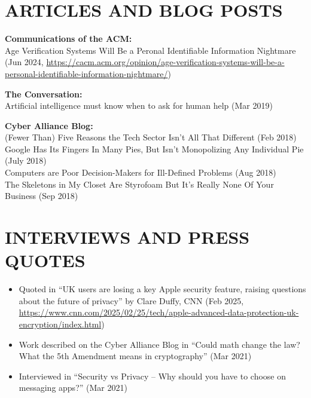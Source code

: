 \documentclass{res}
\begin{document}
\begin{resume}
\section{ARTICLES AND BLOG POSTS}  
\vspace{0.1in}

\textbf{Communications of the ACM:} \\
    Age Verification Systems Will Be a Peronal Identifiable Information Nightmare (Jun 2024, \url{https://cacm.acm.org/opinion/age-verification-systems-will-be-a-personal-identifiable-information-nightmare/})

\textbf{The Conversation:} \\         
    Artificial intelligence must know when to ask for human help (Mar 2019) 

\textbf{Cyber Alliance Blog:} \\         
    (Fewer Than) Five Reasons the Tech Sector Isn't All That Different (Feb 2018) \\
    Google Has Its Fingers In Many Pies, But Isn't Monopolizing Any Individual Pie (July 2018) \\
    Computers are Poor Decision-Makers for Ill-Defined Problems (Aug 2018) \\
    The Skeletons in My Closet Are Styrofoam But It's Really None Of Your Business (Sep 2018) 


\section{INTERVIEWS AND PRESS QUOTES}
\vspace{0.25in}

\begin{itemize}
    \item Quoted in ``UK users are losing a key Apple security feature, raising questions about the future of privacy'' by Clare Duffy, CNN (Feb 2025,
        \url{https://www.cnn.com/2025/02/25/tech/apple-advanced-data-protection-uk-encryption/index.html}) \\
    \item Work described on the Cyber Alliance Blog in ``Could math change the law? What the 5th Amendment means in cryptography'' (Mar 2021) \\
    \item Interviewed in ``Security vs Privacy -- Why should you have to choose on messaging apps?'' (Mar 2021)
\end{itemize}


\end{resume}
\end{document}
